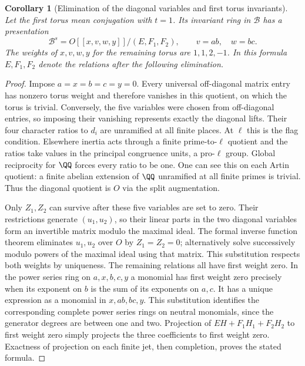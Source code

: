 \documentclass[a4paper,11pt]{article}
\newtheorem{corollary}[proposition]{Corollary}
\theoremstyle{definition}
\theoremstyle{remark}
\numberwithin{equation}{section}
\begin{document}
\begin{corollary}[Elimination of the diagonal variables and first torus invariants]\leavevmode
\label{cor:firsttorus469}
Let the first torus mean conjugation with \(t=1\). Its invariant
ring in \(\mathcal B\) has a presentation
\[
 \mathcal B^{s}=O[[x,v,w,y]]/(E,F_1,F_2),\qquad v=ab,\quad w=bc .
\]
The weights of \(x,v,w,y\) for the remaining torus are
\(1,1,2,-1\). In this formula \(E,F_1,F_2\) denote the relations
after the following elimination.
\end{corollary}
\begin{proof}
Impose \(a=x=b=c=y=0\). Every universal off-diagonal matrix
entry has nonzero torus weight and therefore vanishes in this
quotient, on which the torus is trivial. Conversely, the five
variables were chosen from off-diagonal entries, so imposing
their vanishing represents exactly the diagonal lifts. Their four
character ratios to \(d_i\) are unramified at all finite places.
At \(\ell\) this is the flag condition. Elsewhere inertia acts
through a finite prime-to-\(\ell\) quotient and the ratios take
values in the principal congruence units, a pro-\(\ell\) group.
Global reciprocity for \(\QQ\) forces every ratio to be one. One
can see this on each Artin quotient: a finite abelian extension
of \(\QQ\) unramified at all finite primes is trivial. Thus the
diagonal quotient is \(O\) via the split augmentation.

Only \(Z_1,Z_2\) can survive after these five variables are set
to zero. Their restrictions generate \((u_1,u_2)\), so their
linear parts in the two diagonal variables form an invertible
matrix modulo the maximal ideal. The formal inverse function
theorem eliminates \(u_1,u_2\) over \(O\) by \(Z_1=Z_2=0\);
alternatively solve successively modulo powers of the maximal
ideal using that matrix. This substitution respects both weights
by uniqueness. The remaining relations all have first weight zero.
In the power series ring on \(a,x,b,c,y\) a monomial has first
weight zero precisely when its exponent on \(b\) is the sum of its
exponents on \(a,c\). It has a unique expression as a monomial in
\(x,ab,bc,y\). This substitution identifies the corresponding
complete power series rings on neutral monomials, since the
generator degrees are between one and two. Projection of
\(E H+F_1H_1+F_2H_2\) to first weight zero simply projects the
three coefficients to first weight zero. Exactness of projection
on each finite jet, then completion, proves the stated formula.
\end{proof}
\end{document}
